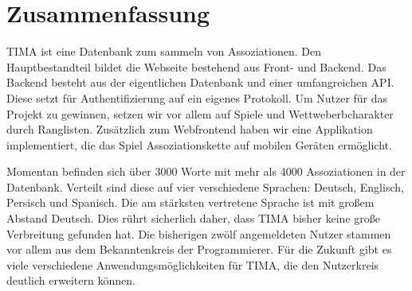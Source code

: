 \chapter{Zusammenfassung}
TIMA ist eine Datenbank zum sammeln von Assoziationen. Den Hauptbestandteil bildet die Webseite bestehend aus Front- und Backend. Das Backend besteht aus der eigentlichen Datenbank und einer umfangreichen API. Diese setzt für Authentifizierung auf ein eigenes Protokoll. Um Nutzer für das Projekt zu gewinnen, setzen wir vor allem auf Spiele und Wettweberbcharakter durch Ranglisten. Zusätzlich zum Webfrontend haben wir eine Applikation implementiert, die das Spiel Assoziationskette auf mobilen Geräten ermöglicht.

Momentan befinden sich über 3000 Worte mit mehr als 4000 Assoziationen in der Datenbank. Verteilt sind diese auf vier verschiedene Sprachen: Deutsch, Englisch, Persisch und Spanisch. Die am stärksten vertretene Sprache ist mit großem Abstand Deutsch. Dies rührt sicherlich daher, dass TIMA bisher keine große Verbreitung gefunden hat. Die bisherigen zwölf angemeldeten Nutzer stammen vor allem aus dem Bekanntenkreis der Programmierer. Für die Zukunft gibt es viele verschiedene Anwendungsmöglichkeiten für TIMA, die den Nutzerkreis deutlich erweitern können.
